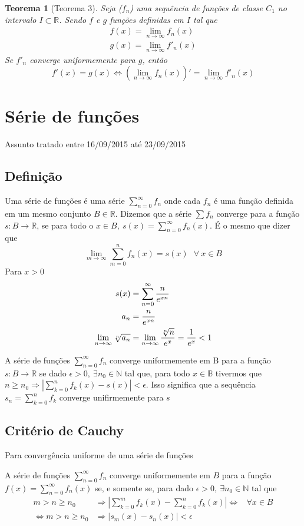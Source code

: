 \documentclass[12pt,openany]{book}
\newtheorem{theorem}{Teorema}[section]
\newcommand{\LI}[1][n]{\lim_{{#1} \rightarrow \infty}}
\newcommand{\soma}[2][n]{\sum_{{#1} = #2}^\infty}
\begin{document}
\begin{theorem}[Teorema 3\label{t:3-3}] 
Seja ($f_n$) uma sequência de funções de classe $C_1$ no intervalo $I \subset \mathds{R}$. Sendo $f$ e $g$ funções definidas em $I$ tal  que \begin{align*}
f(x) = \LI f_n (x) \\
g(x) = \LI f'_n(x)
\end{align*}
Se $f'_n$ converge uniformemente para $g$, então $$f'(x) = g(x) \Longleftrightarrow \left( \LI f_n(x)\right)' = \LI f'_n(x)$$
\end{theorem}

\chapter{Série de funções} {Assunto tratado entre 16/09/2015 até 23/09/2015}
\section{Definição}
\hspace{5mm} Uma série de funções é uma série $\displaystyle{\soma{0} f_n}$ onde cada $f_n$ é uma função definida em um mesmo conjunto $B \in \mathds{R}$. Dizemos que a série $\sum f_n$ converge para a função $s: B \rightarrow \mathds{R}$, se para todo o $x \in B, \ s(x) = \soma{0} f_n(x)$. É o mesmo que dizer que $$\LI[m] \sum_{m=0}^n f_n(x) = s(x) \ \ \  \forall \ x \in B$$
 Para $x > 0$\begin{align*}
 s(x) &= \soma{0} \frac{n}{e^{xn}}\\
 a_n &= {n \over e^{xn}}\\
 \LI \sqrt[n]{a_n} &= \LI {\sqrt[n]{n} \over e^x} = {1 \over e^x} <1
 \end{align*}

A série de funções $\displaystyle{\soma{0} f_n}$ converge uniformemente em B para a função $s: B \rightarrow \mathds{R}$ se dado $\epsilon > 0, \ \exists n_0 \in \mathds{N}$ tal que, para todo $x \in \mathds{B}$ tivermos que $n\geq n_0 \Rightarrow \displaystyle{\left|\sum_{k = 0}^n f_k (x) - s(x)\right| < \epsilon}$. Isso significa que a sequência $s_n = \displaystyle{\sum_{k=0}^n f_k}$ converge unifirmemente para $s$

\section{Critério de Cauchy} {Para convergência uniforme de uma série de funções}

\hspace{5mm} A série de funções $\displaystyle{\soma{0} f_n}$ converge uniformemente em $B$ para a função $\displaystyle{f(x) = \soma{0} f_n(x)}$ se, e somente se, para dado $\epsilon > 0, \ \exists n_0 \in \mathds{N}$ tal que \begin{align*}
m>n \geq n_0 \ &\Rightarrow \left| \sum_{k=0}^m f_k (x) - \sum_{k=0}^n f_k (x)\right|  \Longleftrightarrow & \forall x \in B \\
\Longleftrightarrow m > n \geq n_0 &\Rightarrow |s_m(x) - s_n(x)| < \epsilon
\end{align*}
\end{document}
